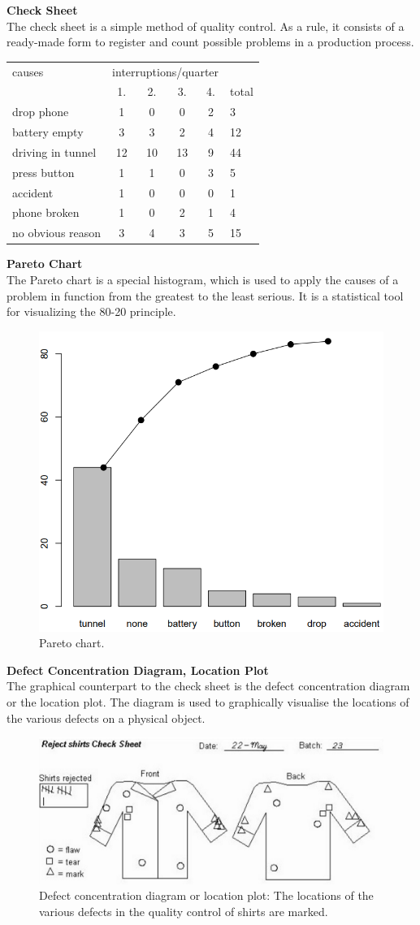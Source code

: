 \textbf{Check Sheet}\\
The check sheet is a simple method of quality control. As a rule, it consists of a ready-made form to register and count possible problems in a production process.\\
\begin{table}[H]
  \scriptsize
  \centering
  \begin{tabular}{l|cccc|l}
    causes            & \multicolumn{4}{l|}{interruptions/quarter} &  \\
                      & 1. & 2. & 3. & 4. & total \\ \hline
    drop phone        & 1  & 0  & 0 & 2  & 3\\
    battery empty     & 3  & 3  & 2 & 4  & 12\\
    driving in tunnel & 12 & 10 & 13 & 9 & 44\\
    press button      & 1  & 1  & 0  & 3 & 5\\
    accident          & 1  & 0  & 0  & 0 & 1\\
    phone broken      & 1  & 0  & 2  & 1 & 4\\
    no obvious reason & 3  & 4  & 3  & 5 & 15
  \end{tabular}
\end{table}

\textbf{Pareto Chart}\\
The Pareto chart is a special histogram, which is used to apply the causes of a problem in function from the greatest to the least serious. It is a statistical tool for visualizing the 80-20 principle.
\begin{figure}[H]
  \centering
  \includegraphics[width = 0.4\linewidth]{Pics/1.2.2.png}
  \caption{Pareto chart.}
\end{figure}

\textbf{Defect Concentration Diagram, Location Plot}\\
The graphical counterpart to the check sheet is the defect concentration diagram or the location plot. The diagram is used to graphically visualise the locations of the various defects on a physical object.
\begin{figure}[H]
  \centering
  \includegraphics[width = 0.6\linewidth]{Pics/1.2.3.png}
  \caption{Defect concentration diagram or location plot: The locations of the various defects in the quality control of shirts are marked.}
\end{figure}

